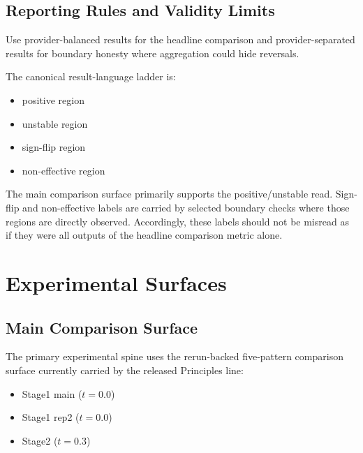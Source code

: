 \documentclass[11pt,a4paper]{article}
\begin{document}
\subsection{Reporting Rules and Validity Limits}

Use provider-balanced results for the headline comparison and provider-separated results for boundary honesty where aggregation could hide reversals.

The canonical result-language ladder is:
\begin{itemize}
  \item positive region
  \item unstable region
  \item sign-flip region
  \item non-effective region
\end{itemize}

The main comparison surface primarily supports the positive/unstable read. Sign-flip and non-effective labels are carried by selected boundary checks where those regions are directly observed. Accordingly, these labels should not be misread as if they were all outputs of the headline comparison metric alone.

\section{Experimental Surfaces}
\label{sec:surfaces}

\subsection{Main Comparison Surface}

The primary experimental spine uses the rerun-backed five-pattern comparison surface currently carried by the released Principles line:
\begin{itemize}
  \item Stage1 main (\(t=0.0\))
  \item Stage1 rep2 (\(t=0.0\))
  \item Stage2 (\(t=0.3\))
\end{itemize}
\end{document}
